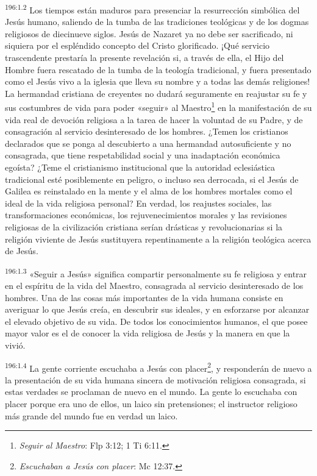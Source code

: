 \par 
\textsuperscript{196:1.2} Los tiempos están maduros para presenciar la resurrección simbólica del Jesús humano, saliendo de la tumba de las tradiciones teológicas y de los dogmas religiosos de diecinueve siglos. Jesús de Nazaret ya no debe ser sacrificado, ni siquiera por el espléndido concepto del Cristo glorificado. ¡Qué servicio trascendente prestaría la presente revelación si, a través de ella, el Hijo del Hombre fuera rescatado de la tumba de la teología tradicional, y fuera presentado como el Jesús vivo a la iglesia que lleva su nombre y a todas las demás religiones! La hermandad cristiana de creyentes no dudará seguramente en reajustar su fe y sus costumbres de vida para poder «seguir» al Maestro\footnote{\textit{Seguir al Maestro}: Flp 3:12; 1 Ti 6:11.} en la manifestación de su vida real de devoción religiosa a la tarea de hacer la voluntad de su Padre, y de consagración al servicio desinteresado de los hombres. ¿Temen los cristianos declarados que se ponga al descubierto a una hermandad autosuficiente y no consagrada, que tiene respetabilidad social y una inadaptación económica egoísta? ¿Teme el cristianismo institucional que la autoridad eclesiástica tradicional esté posiblemente en peligro, o incluso sea derrocada, si el Jesús de Galilea es reinstalado en la mente y el alma de los hombres mortales como el ideal de la vida religiosa personal? En verdad, los reajustes sociales, las transformaciones económicas, los rejuvenecimientos morales y las revisiones religiosas de la civilización cristiana serían drásticas y revolucionarias si la religión viviente de Jesús sustituyera repentinamente a la religión teológica acerca de Jesús.

\par 
\textsuperscript{196:1.3} «Seguir a Jesús» significa compartir personalmente su fe religiosa y entrar en el espíritu de la vida del Maestro, consagrada al servicio desinteresado de los hombres. Una de las cosas más importantes de la vida humana consiste en averiguar lo que Jesús creía, en descubrir sus ideales, y en esforzarse por alcanzar el elevado objetivo de su vida. De todos los conocimientos humanos, el que posee mayor valor es el de conocer la vida religiosa de Jesús y la manera en que la vivió.

\par 
\textsuperscript{196:1.4} La gente corriente escuchaba a Jesús con placer\footnote{\textit{Escuchaban a Jesús con placer}: Mc 12:37.}, y responderán de nuevo a la presentación de su vida humana sincera de motivación religiosa consagrada, si estas verdades se proclaman de nuevo en el mundo. La gente lo escuchaba con placer porque era uno de ellos, un laico sin pretensiones; el instructor religioso más grande del mundo fue en verdad un laico.

